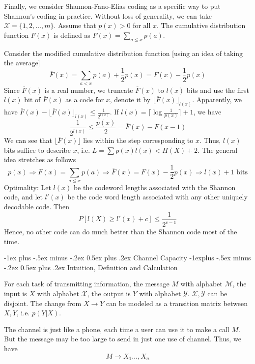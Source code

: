 \documentclass[10pt,landscape, a4paper]{article}
\makeatletter
\renewcommand{\section}{\@startsection{section}{1}{0mm}%
                                {-1ex plus -.5ex minus -.2ex}%
                                {0.5ex plus .2ex}%
                                {\normalfont\large\bfseries}}
\renewcommand{\subsection}{\@startsection{subsection}{2}{0mm}%
                                {-1explus -.5ex minus -.2ex}%
                                {0.5ex plus .2ex}%
                                {\normalfont\normalsize\bfseries}}
\makeatother
\begin{document}
\begin{multicols}{3}
Finally, we consider Shannon-Fano-Elias coding as a specific way to put Shannon's coding in practice. Without loss of generality, we can take $\mathcal{X}=\{1,2,\dots, m\}$. Assume that $p(x)>0$ for all $x$. The cumulative distribution function $F(x)$ is defined as $F(x)=\sum_{a\le x}p(a)$. 

Consider the modified cumulative distribution function [using an idea of taking the average]
$$
\overline{F}(x)=\sum_{a<x}p(a)+\frac{1}{2}p(x)=F(x)-\frac{1}{2}p(x)
$$
Since $\overline{F}(x)$ is a real number, we truncate $\overline{F}(x)$ to $l(x)$ bits and use the first $l(x)$ bit of $\overline{F}(x)$ as a code for $x$, denote it by $\lfloor\overline{F}(x)\rfloor_{l(x)}$. Apparently, we have $\overline{F}(x)-\lfloor\overline{F}(x)\rfloor_{l(x)}\le\frac{1}{2^{l(x)}}$. If $l(x)=\lceil \log\frac{1}{p(x)}\rceil+1$, we have
$$
\frac{1}{2^{l(x)}}\le\frac{p(x)}{2}=\overline{F}(x)-F(x-1)
$$
We can see that $\lfloor \overline{F}(x)\rfloor$ lies within the step corresponding to $x$. Thus, $l(x)$ bits suffice to describe $x$, i.e. $L=\sum p(x)l(x)<H(X)+2$. The general idea stretches as follows
$$
p(x)\Rightarrow F(x)=\sum_{a\le x}p(a)\Rightarrow \overline{F}(x)=F(x)-\frac{1}{2}p(x)\Rightarrow l(x)+\text{1 bits}
$$
Optimality: Let $l(x)$ be the codeword lengths associated with the Shannon code, and let $l'(x)$ be the code word length associated with any other uniquely decodable code. Then
$$
P[l(X)\ge l'(x)+c]\le\frac{1}{2^{c-1}}
$$
Hence, no other code can do much better than the Shannon code most of the time.

\section{Channel Capacity}
\subsection{Intuition, Definition and Calculation}

For each task of transmitting information, the message $M$ with alphabet $\mathcal{M}$, the input is $X$ with alphabet $\mathcal{X}$, the output is $Y$ with alphabet $\mathcal{Y}$. $\mathcal{X},\mathcal{Y}$ can be disjoint. The change from $X\rightarrow Y$ can be modeled as a transition matrix between $X,Y$, i.e. $p(Y|X)$.

The channel is just like a phone, each time a user can use it to make a call $M$. But the message may be too large to send in just one use of channel. Thus, we have
$$
M\rightarrow X_1\dots, X_n
$$


\end{multicols}
\end{document}
